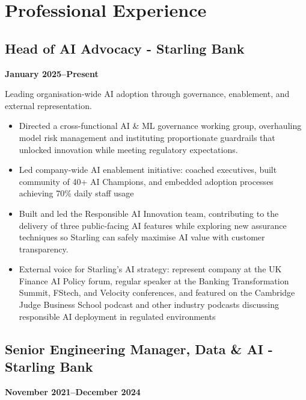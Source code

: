 \documentclass[a4paper]{scrartcl}
\begin{document}
\section*{Professional Experience}

\subsection*{Head of AI Advocacy - Starling Bank}
\textbf{January 2025--Present}

Leading organisation-wide AI adoption through governance, enablement, and external representation.
\begin{itemize}
	\item Directed a cross-functional AI \& ML governance working group, overhauling model risk management and instituting proportionate guardrails that unlocked innovation while meeting regulatory expectations.
	\item Led company-wide AI enablement initiative: coached executives, built community of 40+ AI Champions, and embedded adoption processes achieving 70\% daily staff usage
	\item Built and led the Responsible AI Innovation team, contributing to the delivery of three public-facing AI features while exploring new assurance techniques so Starling can safely maximise AI value with customer transparency.
	\item External voice for Starling's AI strategy: represent company at the UK Finance AI Policy forum, regular speaker at the Banking Transformation Summit, FStech, and Velocity conferences, and featured on the Cambridge Judge Business School podcast and other industry podcasts discussing responsible AI deployment in regulated environments
\end{itemize}

\subsection*{Senior Engineering Manager, Data \& AI - Starling Bank}
\textbf{November 2021--December 2024}
\end{document}
